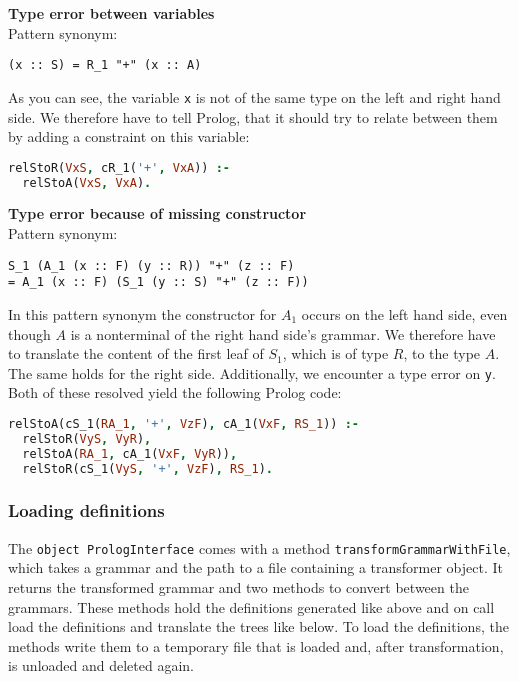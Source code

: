 \documentclass[a4paper]{article}
\begin{document}
{\bfseries Type error between variables}\\
Pattern synonym:
\begin{lstlisting}[language=transformer]
 (x :: S) = R_1 "+" (x :: A)
\end{lstlisting}
As you can see, the variable \verb|x| is not of the same type on the left and right hand side. We therefore have to tell Prolog, that it should try to relate between them by adding a constraint on this variable:
\begin{lstlisting}[language=Prolog]
relStoR(VxS, cR_1('+', VxA)) :-
  relStoA(VxS, VxA).
\end{lstlisting}

{\bfseries Type error because of missing constructor}\\%
Pattern synonym:
\begin{lstlisting}[language=transformer]
  S_1 (A_1 (x :: F) (y :: R)) "+" (z :: F) 
= A_1 (x :: F) (S_1 (y :: S) "+" (z :: F))
\end{lstlisting}
In this pattern synonym the constructor for $A_1$ occurs on the left hand side, even though $A$ is a nonterminal of the right hand side's grammar. We therefore have to translate the content of the first leaf of $S_1$, which is of type $R$, to the type $A$. The same holds for the right side. Additionally, we encounter a type error on \verb|y|. Both of these resolved yield the following Prolog code:
\begin{lstlisting}[language=Prolog]
relStoA(cS_1(RA_1, '+', VzF), cA_1(VxF, RS_1)) :-
  relStoR(VyS, VyR),
  relStoA(RA_1, cA_1(VxF, VyR)),
  relStoR(cS_1(VyS, '+', VzF), RS_1).
\end{lstlisting}

\subsubsection*{Loading definitions}
The \lstinline{object PrologInterface} comes with a method \lstinline{transformGrammarWithFile}, which takes a grammar and the path to a file containing a transformer object. It returns the transformed grammar and two methods to convert between the grammars. These methods hold the definitions generated like above and on call load the definitions and translate the trees like below. To load the definitions, the methods write them to a temporary file that is loaded and, after transformation, is unloaded and deleted again.
\end{document}

